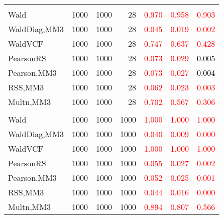 \documentclass[
]{article}
\begin{document}
\begin{table}[H]
{\begin{tabular}[t]{lrrrrrr}
\addlinespace[0.3em]
\multicolumn{7}{l}{\textbf{2F 10V}}\\
\hspace{1em}Wald & 1000 & 1000 & 28 & \textcolor{red}{0.970} & \textcolor{red}{0.958} & \textcolor{red}{0.903}\\
\hspace{1em}WaldDiag,MM3 & 1000 & 1000 & 28 & \textcolor{red}{0.045} & \textcolor{red}{0.019} & \textcolor{red}{0.002}\\
\hspace{1em}WaldVCF & 1000 & 1000 & 28 & \textcolor{red}{0.747} & \textcolor{red}{0.637} & \textcolor{red}{0.428}\\
\hspace{1em}PearsonRS & 1000 & 1000 & 28 & \textcolor{red}{0.073} & \textcolor{red}{0.029} & \textcolor{black}{0.005}\\
\hspace{1em}Pearson,MM3 & 1000 & 1000 & 28 & \textcolor{red}{0.073} & \textcolor{red}{0.027} & \textcolor{black}{0.004}\\
\hspace{1em}RSS,MM3 & 1000 & 1000 & 28 & \textcolor{red}{0.062} & \textcolor{red}{0.023} & \textcolor{red}{0.003}\\
\hspace{1em}Multn,MM3 & 1000 & 1000 & 28 & \textcolor{red}{0.702} & \textcolor{red}{0.567} & \textcolor{red}{0.306}\\
\addlinespace[0.3em]
\multicolumn{7}{l}{\textbf{3F 15V}}\\
\hspace{1em}Wald & 1000 & 1000 & 1000 & \textcolor{red}{1.000} & \textcolor{red}{1.000} & \textcolor{red}{1.000}\\
\hspace{1em}WaldDiag,MM3 & 1000 & 1000 & 1000 & \textcolor{red}{0.040} & \textcolor{red}{0.009} & \textcolor{red}{0.000}\\
\hspace{1em}WaldVCF & 1000 & 1000 & 1000 & \textcolor{red}{1.000} & \textcolor{red}{1.000} & \textcolor{red}{1.000}\\
\hspace{1em}PearsonRS & 1000 & 1000 & 1000 & \textcolor{red}{0.055} & \textcolor{red}{0.027} & \textcolor{red}{0.002}\\
\hspace{1em}Pearson,MM3 & 1000 & 1000 & 1000 & \textcolor{red}{0.052} & \textcolor{red}{0.025} & \textcolor{red}{0.001}\\
\hspace{1em}RSS,MM3 & 1000 & 1000 & 1000 & \textcolor{red}{0.044} & \textcolor{red}{0.016} & \textcolor{red}{0.000}\\
\hspace{1em}Multn,MM3 & 1000 & 1000 & 1000 & \textcolor{red}{0.894} & \textcolor{red}{0.807} & \textcolor{red}{0.566}\\
\bottomrule
\end{tabular}}
\endgroup{}
\end{table}
\end{document}
